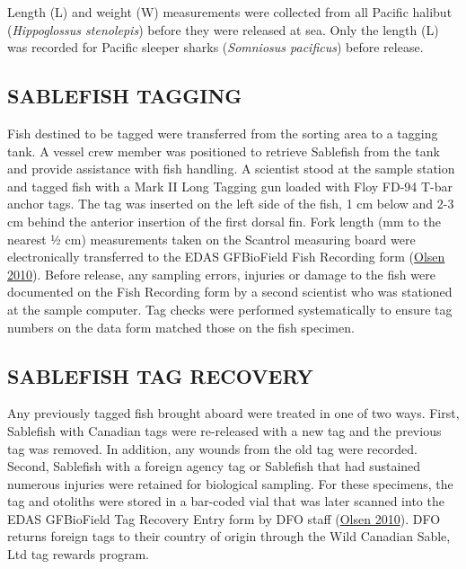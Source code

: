 \documentclass[12pt]{article}\usepackage[]{graphicx}\usepackage[]{color}
\begin{document}
Length (L) and weight (W) measurements were collected from all Pacific halibut (\emph{Hippoglossus stenolepis}) before they were released at sea. Only the length (L) was recorded for Pacific sleeper sharks (\emph{Somniosus pacificus}) before release.

\hypertarget{sablefish-tagging}{%
\subsection{SABLEFISH TAGGING}\label{sablefish-tagging}}

Fish destined to be tagged were transferred from the sorting area to a tagging tank. A vessel crew member was positioned to retrieve Sablefish from the tank and provide assistance with fish handling. A scientist stood at the sample station and tagged fish with a Mark II Long Tagging gun loaded with Floy FD-94 T-bar anchor tags. The tag was inserted on the left side of the fish, 1 cm below and 2-3 cm behind the anterior insertion of the first dorsal fin. Fork length (mm to the nearest ½ cm) measurements taken on the Scantrol measuring board were electronically transferred to the EDAS GFBioField Fish Recording form (\protect\hyperlink{ref-Olsen2010}{Olsen 2010}). Before release, any sampling errors, injuries or damage to the fish were documented on the Fish Recording form by a second scientist who was stationed at the sample computer. Tag checks were performed systematically to ensure tag numbers on the data form matched those on the fish specimen.

\hypertarget{sablefish-tag-recovery}{%
\subsection{SABLEFISH TAG RECOVERY}\label{sablefish-tag-recovery}}

Any previously tagged fish brought aboard were treated in one of two ways. First, Sablefish with Canadian tags were re-released with a new tag and the previous tag was removed. In addition, any wounds from the old tag were recorded. Second, Sablefish with a foreign agency tag or Sablefish that had sustained numerous injuries were retained for biological sampling. For these specimens, the tag and otoliths were stored in a bar-coded vial that was later scanned into the EDAS GFBioField Tag Recovery Entry form by DFO staff (\protect\hyperlink{ref-Olsen2010}{Olsen 2010}). DFO returns foreign tags to their country of origin through the Wild Canadian Sable, Ltd tag rewards program.
\end{document}
